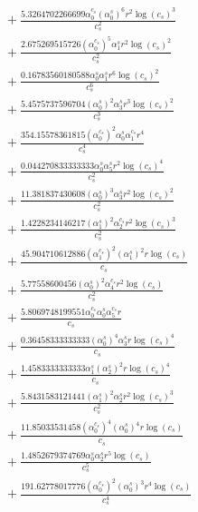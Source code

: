 \documentclass[10pt]{article}
\begin{document}
\begin{align*}
&{}  + \frac{5.3264702266699 \alpha_{0}^{c_s} \left(\alpha_{0}^s\right)^{6} r^{2} \log{\left(c_{s} \right)}^{3}}{c_{s}^{2}} \\
&{}  + \frac{2.675269515726 \left(\alpha_{0}^{c_s}\right)^{5} \alpha_{1}^s r^{2} \log{\left(c_{s} \right)}^{2}}{c_{s}^{2}} \\
&{}  + \frac{0.16783560180588 \alpha_{0}^s \alpha_{1}^s r^{6} \log{\left(c_{s} \right)}^{2}}{c_{s}^{6}} \\
&{}  + \frac{5.4575737596704 \left(\alpha_{0}^s\right)^{2} \alpha_{3}^s r^{3} \log{\left(c_{s} \right)}^{2}}{c_{s}^{3}} \\
&{}  + \frac{354.15578361815 \left(\alpha_{0}^{c_s}\right)^{2} \alpha_{0}^s \alpha_{1}^{c_s} r^{4}}{c_{s}^{4}} \\
&{}  + \frac{0.044270833333333 \alpha_{0}^s \alpha_{5}^s r^{2} \log{\left(c_{s} \right)}^{4}}{c_{s}^{2}} \\
&{}  + \frac{11.381837430608 \left(\alpha_{0}^s\right)^{3} \alpha_{3}^s r^{2} \log{\left(c_{s} \right)}^{2}}{c_{s}^{2}} \\
&{}  + \frac{1.4228234146217 \left(\alpha_{1}^s\right)^{2} \alpha_{2}^{c_s} r^{2} \log{\left(c_{s} \right)}^{3}}{c_{s}^{2}} \\
&{}  + \frac{45.904710612886 \left(\alpha_{1}^{c_s}\right)^{2} \left(\alpha_{1}^s\right)^{2} r \log{\left(c_{s} \right)}}{c_{s}} \\
&{}  + \frac{5.77558600456 \left(\alpha_{0}^s\right)^{2} \alpha_{4}^{c_s} r^{2} \log{\left(c_{s} \right)}}{c_{s}^{2}} \\
&{}  + \frac{5.8069748199551 \alpha_{0}^{c_s} \alpha_{0}^s \alpha_{5}^{c_s} r}{c_{s}} \\
&{}  + \frac{0.36458333333333 \left(\alpha_{0}^s\right)^{4} \alpha_{3}^s r \log{\left(c_{s} \right)}^{4}}{c_{s}} \\
&{}  + \frac{1.4583333333333 \alpha_{1}^s \left(\alpha_{2}^s\right)^{2} r \log{\left(c_{s} \right)}^{4}}{c_{s}} \\
&{}  + \frac{5.8431583121441 \left(\alpha_{1}^s\right)^{2} \alpha_{2}^s r^{2} \log{\left(c_{s} \right)}^{3}}{c_{s}^{2}} \\
&{}  + \frac{11.85033531458 \left(\alpha_{0}^{c_s}\right)^{4} \left(\alpha_{0}^s\right)^{4} r \log{\left(c_{s} \right)}}{c_{s}} \\
&{}  + \frac{1.4852679374769 \alpha_{0}^s \alpha_{2}^s r^{5} \log{\left(c_{s} \right)}}{c_{s}^{5}} \\
&{}  + \frac{191.62778017776 \left(\alpha_{0}^{c_s}\right)^{2} \left(\alpha_{0}^s\right)^{3} r^{4} \log{\left(c_{s} \right)}}{c_{s}^{4}} \\

\end{align*}
\end{document}
